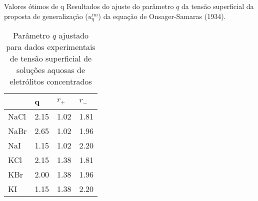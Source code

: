 \documentclass{beamer}
\begin{document}
\begin{frame}{Valores ótimos de q}
	Resultados do ajuste do parâmetro $q$ da tensão superficial da proposta de generalização ($u^{im}_q$)
	da equação de Onsager-Samaras (1934).
	\begin{table}
		\caption{Parâmetro $q$ ajustado para dados experimentais de tensão superficial de soluções aquosas
		de eletrólitos concentrados}
		\begin{tabular}{l|lll}
		&            q   &       $r_{+}$ &    $r_{-}$  \\\hline
{NaCl}    	&         2.15    &     1.02       &    1.81    \\
{NaBr}    	&         2.65    &     1.02       &    1.96    \\
{NaI }    	&          1.15   &      1.02      &     2.20   \\ 
{KCl }    	&          2.15   &      1.38      &    1.81    \\
{KBr }    	&          2.00   &      1.38      &    1.96    \\
{KI  }    	&           1.15  &       1.38     &     2.20   
		\end{tabular}
	\end{table}

\end{frame}
\end{document}
